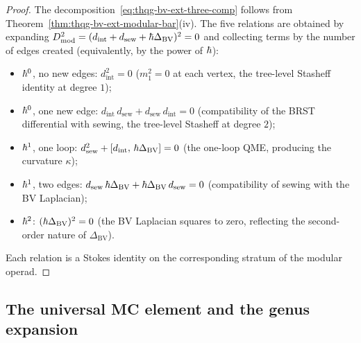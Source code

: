 \begin{proof}
The decomposition~\eqref{eq:thqg-bv-ext-three-comp} follows from
Theorem~\ref{thm:thqg-bv-ext-modular-bar}(iv).
The five relations are obtained by expanding
$D_{\mathrm{mod}}^2 = (d_{\mathrm{int}} + d_{\mathrm{sew}}
+ \hbar\Delta_{\mathrm{BV}})^2 = 0$ and collecting terms by the
number of edges created (equivalently, by the power of $\hbar$):
\begin{itemize}
\item $\hbar^0$, no new edges: $d_{\mathrm{int}}^2 = 0$
 ($m_1^2 = 0$ at each vertex, the tree-level Stasheff identity
 at degree $1$);
\item $\hbar^0$, one new edge:
 $d_{\mathrm{int}}\,d_{\mathrm{sew}}
 + d_{\mathrm{sew}}\,d_{\mathrm{int}} = 0$ (compatibility
 of the BRST differential with sewing, the tree-level Stasheff
 at degree $2$);
\item $\hbar^1$, one loop:
 $d_{\mathrm{sew}}^2 + [d_{\mathrm{int}},\,
 \hbar\Delta_{\mathrm{BV}}] = 0$ (the one-loop QME, producing
 the curvature $\kappa$);
\item $\hbar^1$, two edges:
 $d_{\mathrm{sew}}\,\hbar\Delta_{\mathrm{BV}}
 + \hbar\Delta_{\mathrm{BV}}\,d_{\mathrm{sew}} = 0$
 (compatibility of sewing with the BV Laplacian);
\item $\hbar^2$: $(\hbar\Delta_{\mathrm{BV}})^2 = 0$ (the BV
 Laplacian squares to zero, reflecting the second-order
 nature of $\Delta_{\mathrm{BV}}$).
\end{itemize}
Each relation is a Stokes identity on the corresponding stratum of
the modular operad.
\end{proof}

\subsection{The universal MC element and the genus expansion}

